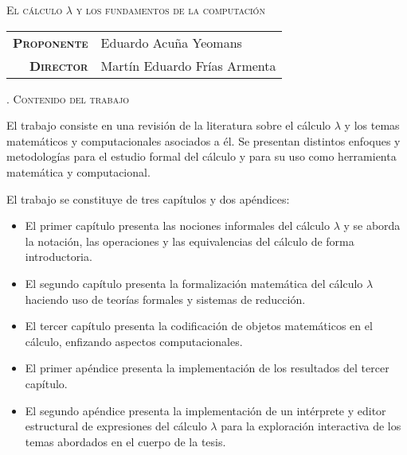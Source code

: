 \documentclass[10pt,letterpaper]{article}
\newcommand{\RomanNumeral}[1]{\uppercase\expandafter{\romannumeral #1\relax}}
\newcommand{\tesis}{El cálculo \( λ \) y los fundamentos de la computación}
\newcommand{\estudiante}{Eduardo Acuña Yeomans}
\newcommand{\director}{Martín Eduardo Frías Armenta}
\begin{document}
\thispagestyle{empty}

\begin{center}
  \Large{\textsc{\tesis}}\\
  \normalsize
  \vspace*{25pt}
  \begin{tabular}{r l}
    \textbf{\textsc{Proponente}} & \estudiante \\
    \textbf{\textsc{Director}} & \director
  \end{tabular}
  \vspace*{25pt}
\end{center}

\begin{abstract}
  El cálculo \( λ \) es un lenguaje y herramienta para el estudio del cómputo, ha sido utilizado para explorar las cuestiones más fundamentales de la teoría de la computación como el significado de algoritmo y las limitaciones intrínsecas de ellos. Este trabajo presenta una introducción al estudio del cálculo \( λ \) puro, abordando desde los aspectos superficiales como la notación y las estructuras sintácticas que permite expresar, hasta el significado de las expresiones y las ideas subyacentes a estas. Se presenta un tratamiento matemático del tema, utilizando dos perspectivas de formalización: con teorías formales y con sistemas de reducción. También se presenta un tratamiento computacional del tema, desarrollando representaciones algorítmicas del álgebra booleana, la aritmética elemental, los procesos recursivos y las estructuras recursivas.
\end{abstract}

\begin{center}
  \large
  \textsc{\RomanNumeral{1}. Contenido del trabajo}
\end{center}

El trabajo consiste en una revisión de la literatura sobre el cálculo \( λ \) y los temas matemáticos y computacionales asociados a él. Se presentan distintos enfoques y metodologías para el estudio formal del cálculo y para su uso como herramienta matemática y computacional.

El trabajo se constituye de tres capítulos y dos apéndices:
\begin{itemize}
\item El primer capítulo presenta las nociones informales del cálculo \( λ \) y se aborda la notación, las operaciones y las equivalencias del cálculo de forma introductoria.
\item El segundo capítulo presenta la formalización matemática del cálculo \( λ \) haciendo uso de teorías formales y sistemas de reducción.
\item El tercer capítulo presenta la codificación de objetos matemáticos en el cálculo, enfizando aspectos computacionales.
\item El primer apéndice presenta la implementación de los resultados del tercer capítulo.
\item El segundo apéndice presenta la implementación de un intérprete y editor estructural de expresiones del cálculo \( λ \) para la exploración interactiva de los temas abordados en el cuerpo de la tesis.
\end{itemize}
  
\end{document}
